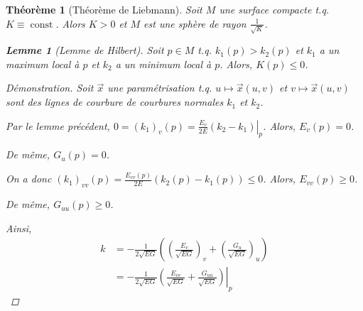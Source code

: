 \documentclass{report}
\newtheorem*{thm}{Th\'eor\`eme}
\newtheorem*{lem}{Lemme}
\theoremstyle{definition}
\theoremstyle{remark}
\newenvironment*{subproof}[1][D\'emonstration]
{
\begin{proof}[#1]

}
{
\renewcommand{\qedsymbol}{$\blacksquare$}
\end{proof}
\renewcommand{\qedsymbol}{$\square$}
}
\def\lte{\leqslant}
\def\gte{\geqslant}
\begin{document}
	\begin{thm}[Th\'eor\`eme de Liebmann]
		Soit $M$ une surface compacte t.q. $K\equiv\operatorname{const}$. Alors $K>0$ et $M$ est une sph\`ere de rayon $\frac{1}{\sqrt{K}}$.
		\begin{lem}[Lemme de Hilbert]
			Soit $p\in M$ t.q. $k_1(p)>k_2(p)$ et $k_1$ a un maximum local \`a $p$ et $k_2$ a un minimum local \`a $p$. Alors, $K(p)\lte0$.
			\begin{subproof}
				Soit $\vec x$ une param\'etrisation t.q. $u\mapsto\vec x(u,v)$ et $v\mapsto\vec x(u,v)$ sont des lignes de courbure de courbures normales $k_1$ et $k_2$.

				Par le lemme pr\'ec\'edent, $0 = (k_1)_v(p) = \left. \frac{E_v}{2E}(k_2-k_1) \right|_p$. Alors, $E_v(p)=0$.

				De m\^eme, $G_u(p)=0$.

				On a donc $(k_1)_{vv}(p) = \frac{E_{vv}(p)}{2E}(k_2(p)-k_1(p)) \lte 0$. Alors, $E_{vv}(p)\gte0$.

				De m\^eme, $G_{uu}(p)\gte0$.

				Ainsi,
				\begin{align*}
					k&= -\frac{1}{2\sqrt{EG}}\left(\left( \frac{E_v}{\sqrt{EG}}\right)_v +\left( \frac{G_u}{\sqrt{EG}}\right)_u \right)\\
					&= \left.-\frac{1}{2\sqrt{EG}} \left(\frac{E_{vv}}{\sqrt{EG}}+\frac{G_{uu}}{\sqrt{EG}}\right)\right|_p
				\end{align*}
			\end{subproof}
		\end{lem}
	\end{thm}
\end{document}
